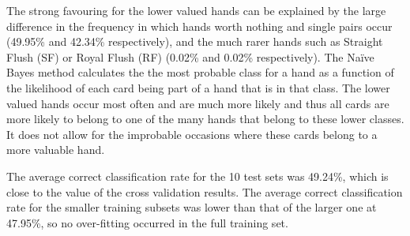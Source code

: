 \documentclass[10pt, a4paper]{article}
\begin{document}
The strong favouring for the lower valued hands can be explained by the large difference in the frequency in which hands worth nothing and single pairs occur (49.95\% and 42.34\% respectively), and the much rarer hands such as Straight Flush (SF) or Royal Flush (RF) (0.02\% and 0.02\% respectively). The Na\"ive Bayes method calculates the the most probable class for a hand as a function of the likelihood of each card being part of a hand that is in that class. The lower valued hands occur most often and are much more likely and thus all cards are more likely to belong to one of the many hands that belong to these lower classes. It does not allow for the improbable occasions where these cards belong to a more valuable hand.

The average correct classification rate for the 10 test sets was 49.24\%, which is close to the value of the cross validation results. The average correct classification rate for the smaller training subsets was lower than that of the larger one at 47.95\%, so no over-fitting occurred in the full training set. 
\end{document}
